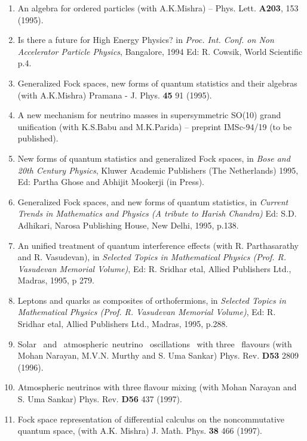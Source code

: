 \begin{enumerate}
\item An algebra for ordered particles (with A.K.Mishra) --
Phys. Lett. {\bf A203}, 153 (1995).

\item Is there a future for High Energy Physics? in {\it Proc. Int.
Conf. on Non Accelerator Particle Physics}, Bangalore, 1994 Ed: R.
Cowsik, World Scientific p.4.

\item Generalized Fock spaces, new forms of quantum statistics and
their algebras (with A.K.Mishra) Pramana - J. Phys. {\bf 45} 91 (1995).

\item A new mechanism for neutrino masses in supersymmetric SO(10)
grand unification (with K.S.Babu and M.K.Parida) -- preprint IMSc-94/19
(to be published).

\item New forms of quantum statistics and generalized Fock spaces,
in {\it Bose and 20th Century Physics}, Kluwer Academic Publishers (The
Netherlands) 1995, Ed: Partha Ghose and Abhijit Mookerji (in Press).

\item Generalized Fock spaces, and new forms of quantum statistics, in
{\it Current Trends  in Mathematics and Physics
(A tribute to Harish Chandra)} Ed: S.D. Adhikari,
Narosa Publishing House, New Delhi, 1995, p.138. 

\item An unified treatment of quantum interference effects (with R.
Parthasarathy and R. Vasudevan), in {\it Selected Topics in Mathematical
Physics (Prof. R. Vasudevan Memorial Volume)}, Ed: R. Sridhar etal,
Allied Publishers Ltd., Madras, 1995, p 279.

\item Leptons and quarks as composites of orthofermions, in {\it
Selected Topics in Mathematical Physics (Prof. R. Vasudevan Memorial
Volume)}, Ed: R. Sridhar etal, Allied Publishers Ltd., Madras, 1995,
p.288.

\item Solar \ and \ atmospheric\ neutrino \ oscillations \ with
three \ flavours (with Mohan Narayan, M.V.N. Murthy and S. Uma Sankar)
Phys. Rev. {\bf D53} 2809 (1996).

\item Atmospheric neutrinos with three flavour mixing (with Mohan
Narayan and S. Uma Sankar) Phys. Rev. {\bf D56} 437 (1997).

\item Fock space representation of differential calculus on the
noncommutative quantum space, (with A.K. Mishra) 
J. Math. Phys. {\bf 38} 466 (1997).


\end{enumerate}
